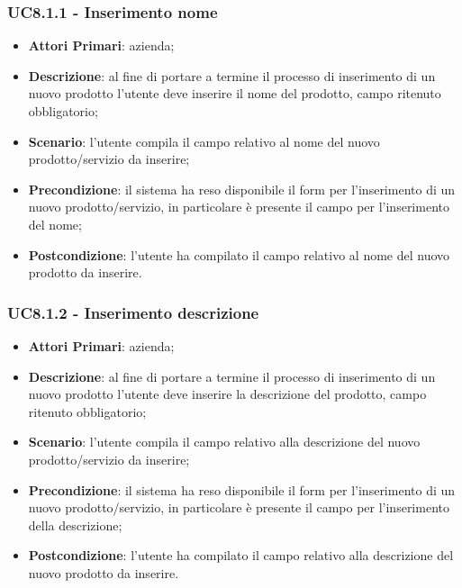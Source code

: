 \subsubsection{UC8.1.1 - Inserimento nome}
\begin{itemize}
	\item \textbf{Attori Primari}: azienda;
	\item \textbf{Descrizione}: al fine di portare a termine il processo di inserimento di un nuovo prodotto l'utente deve inserire il nome del prodotto, campo ritenuto obbligatorio;
	\item \textbf{Scenario}: l'utente compila il campo relativo al nome del nuovo prodotto/servizio da inserire;
	\item \textbf{Precondizione}: il sistema ha reso disponibile il form per l'inserimento di un nuovo prodotto/servizio, in particolare è presente il campo per l'inserimento del nome;
	\item \textbf{Postcondizione}: l'utente ha compilato il campo relativo al nome del nuovo prodotto da inserire.
\end{itemize}
\subsubsection{UC8.1.2 - Inserimento descrizione}
\begin{itemize}
	\item \textbf{Attori Primari}: azienda;
	\item \textbf{Descrizione}: al fine di portare a termine il processo di inserimento di un nuovo prodotto l'utente deve inserire la descrizione del prodotto, campo ritenuto obbligatorio;
	\item \textbf{Scenario}: l'utente compila il campo relativo alla descrizione del nuovo prodotto/servizio da inserire;
	\item \textbf{Precondizione}: il sistema ha reso disponibile il form per l'inserimento di un nuovo prodotto/servizio, in particolare è presente il campo per l'inserimento della descrizione;
	\item \textbf{Postcondizione}: l'utente ha compilato il campo relativo alla descrizione del nuovo prodotto da inserire.
\end{itemize}
